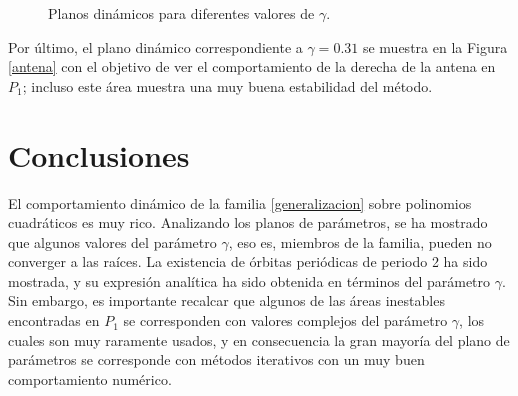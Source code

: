 \begin{figure}[h!]
	\caption{Planos dinámicos para diferentes valores de $\gamma$.}
\end{figure}

Por último, el plano dinámico correspondiente a $\gamma=0.31$ se muestra en la Figura \ref{antena} con el objetivo de ver el comportamiento de la derecha de la antena en $P_1$; incluso este área muestra una muy buena estabilidad del método. 

\section{Conclusiones}

El comportamiento dinámico de la familia \eqref{generalizacion} sobre polinomios cuadráticos es muy rico. Analizando los planos de parámetros, se ha mostrado que algunos valores del parámetro $\gamma$, eso es, miembros de la familia, pueden no converger a las raíces. La existencia de órbitas periódicas de periodo 2 ha sido mostrada, y su expresión analítica ha sido obtenida en términos del parámetro $\gamma$. Sin embargo, es importante recalcar que algunos de las áreas inestables encontradas en $P_1$ se corresponden con valores complejos del parámetro $\gamma$, los cuales son muy raramente usados, y en consecuencia la gran mayoría del plano de parámetros se corresponde con métodos iterativos con un muy buen comportamiento numérico.